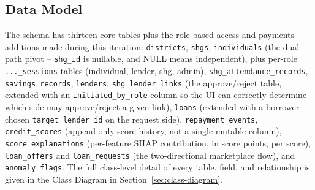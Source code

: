 \documentclass[11pt,a4paper]{article}
\begin{document}
\subsection{Data Model}
The schema has thirteen core tables plus the role-based-access and
payments additions made during this iteration: \texttt{districts},
\texttt{shgs}, \texttt{individuals} (the dual-path pivot --
\texttt{shg\_id} is nullable, and NULL means independent), plus
per-role \texttt{...\_sessions} tables (individual, lender, shg,
admin), \texttt{shg\_attendance\_records}, \texttt{savings\_records},
\texttt{lenders}, \texttt{shg\_lender\_links} (the approve/reject
table, extended with an \texttt{initiated\_by\_role} column so the UI
can correctly determine which side may approve/reject a given link),
\texttt{loans} (extended with a borrower-chosen
\texttt{target\_lender\_id} on the request side), \texttt{repayment\_events},
\texttt{credit\_scores} (append-only score history, not a single
mutable column), \texttt{score\_explanations} (per-feature SHAP
contribution, in score points, per score), \texttt{loan\_offers} and
\texttt{loan\_requests} (the two-directional marketplace flow), and
\texttt{anomaly\_flags}. The full class-level detail of every table,
field, and relationship is given in the Class Diagram in
Section~\ref{sec:class-diagram}.
\end{document}
